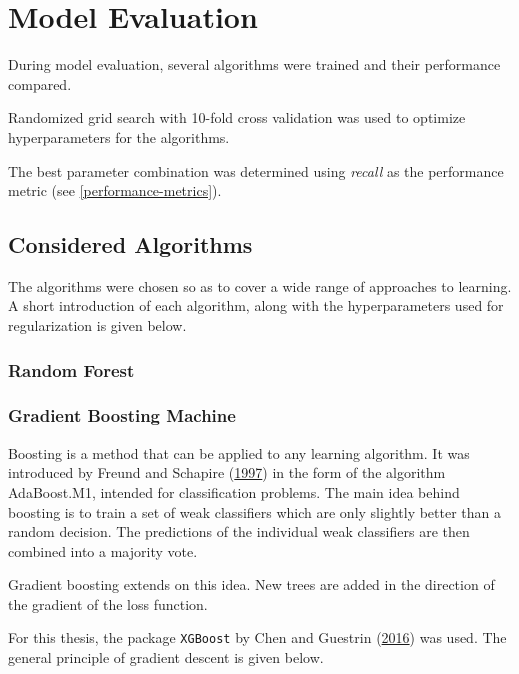 \documentclass[
  11pt,
  a4paper,
  DIV=12,captions=tableheading,oneside]{scrbook}
\begin{document}
\hypertarget{model-evaluation}{%
\section{Model Evaluation}\label{model-evaluation}}

During model evaluation, several algorithms were trained and their performance compared.

Randomized grid search with 10-fold cross validation was used to optimize hyperparameters for the algorithms.

The best parameter combination was determined using \emph{recall} as the performance metric (see \ref{performance-metrics}).

\hypertarget{considered-algorithms}{%
\subsection{Considered Algorithms}\label{considered-algorithms}}

The algorithms were chosen so as to cover a wide range of approaches to learning. A short introduction of each algorithm, along with the hyperparameters used for regularization is given below.

\hypertarget{random-forest}{%
\subsubsection{Random Forest}\label{random-forest}}

\hypertarget{gradient-boosting-machine}{%
\subsubsection{Gradient Boosting Machine}\label{gradient-boosting-machine}}

Boosting is a method that can be applied to any learning algorithm. It was introduced by Freund and Schapire (\protect\hyperlink{ref-freund1997decision}{1997}) in the form of the algorithm AdaBoost.M1, intended for classification problems. The main idea behind boosting is to train a set of weak classifiers which are only slightly better than a random decision. The predictions of the individual weak classifiers are then combined into a majority vote.

Gradient boosting extends on this idea. New trees are added in the direction of the gradient of the loss function.

For this thesis, the package \texttt{XGBoost} by Chen and Guestrin (\protect\hyperlink{ref-chen2016xgboost}{2016}) was used. The general principle of gradient descent is given below.
\end{document}
